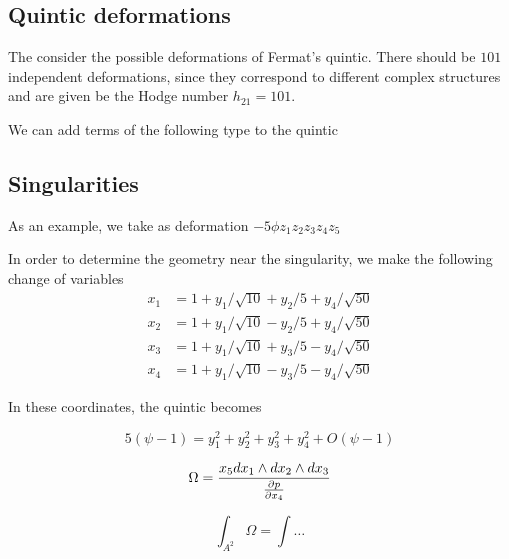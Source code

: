 
\subsection{Quintic deformations}
The consider the possible deformations of Fermat's quintic.
There should be $101$ independent deformations, since they correspond to different complex 
structures and are given be the Hodge number $h_{21}=101$.

We can add terms of the following type to the quintic




\subsection{Singularities}

As an example, we take as deformation $-5\phi z_1 z_2 z_3 z_4 z_5$




In order to determine the geometry near the singularity, we make the following change of 
variables
\begin{equation}
  \begin{align}
  x_1 &= 1 + y_1/\sqrt{10} + y_2/5 + y_4/\sqrt{50}\\
  x_2 &= 1 + y_1/\sqrt{10} - y_2/5 + y_4/\sqrt{50}\\
  x_3 &= 1 + y_1/\sqrt{10} + y_3/5 - y_4/\sqrt{50}\\
  x_4 &= 1 + y_1/\sqrt{10} - y_3/5 - y_4/\sqrt{50}
  \end{align}
\end{equation}

In these coordinates, the quintic becomes

\begin{equation}
  5(\psi -1 ) =  y_1^2 + y_2^2 + y_3^2 + y_4^2 + O( \psi -1 )
\end{equation}






\begin{equation}
  \Omega = \frac{x_5 dx_1 \wedge dx_2\wedge dx_3}{\pdv{p}{x_4}}
\end{equation}


\begin{equation}
  \int_{A^2} \Omega = \int  \dots
\end{equation}







